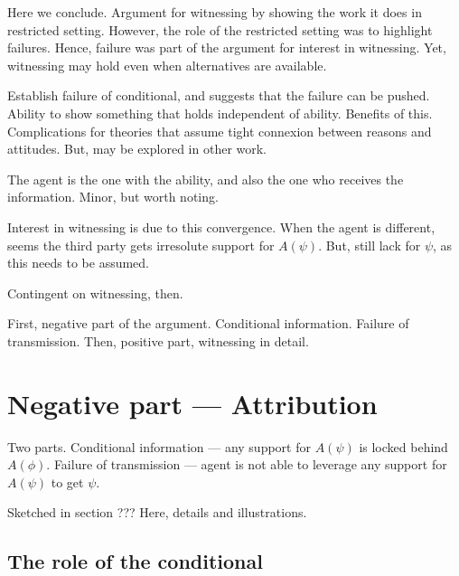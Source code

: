 \documentclass[10pt]{article}
\newcommand{\hozlinedash}[0]{%
  \noindent\hdashrule[0.5ex][c]{\textwidth}{.1pt}{2.5pt}
}
\begin{document}
\begin{note}
  Here we conclude.
  Argument for witnessing by showing the work it does in restricted setting.
  However, the role of the restricted setting was to highlight failures.
  Hence, failure was part of the argument for interest in witnessing.
  Yet, witnessing may hold even when alternatives are available.

  Establish failure of conditional, and suggests that the failure can be pushed.
  Ability to show something that holds independent of ability.
  Benefits of this.
  Complications for theories that assume tight connexion between reasons and attitudes.
  But, may be explored in other work.
\end{note}

\begin{note}
  The agent is the one with the ability, and also the one who receives the information.
  Minor, but worth noting.

  Interest in witnessing is due to this convergence.
  When the agent is different, seems the third party gets irresolute support for \(A(\psi)\).
  But, still lack for \(\psi\), as this needs to be assumed.

  Contingent on witnessing, then.
\end{note}

\begin{note}[Outline]
  First, negative part of the argument.
  Conditional information.
  Failure of transmission.
  Then, positive part, witnessing in detail.
\end{note}

\hozlinedash

\section{Negative part --- Attribution}
\label{sec:negative-part}

Two parts.
Conditional information --- any support for \(A(\psi)\) is locked behind \(A(\phi)\).
Failure of transmission --- agent is not able to leverage any support for \(A(\psi)\) to get \(\psi\).

Sketched in {\color{red} section ???}
Here, details and illustrations.

\subsection{The role of the conditional}
\label{sec:role-conditional}
\end{document}
